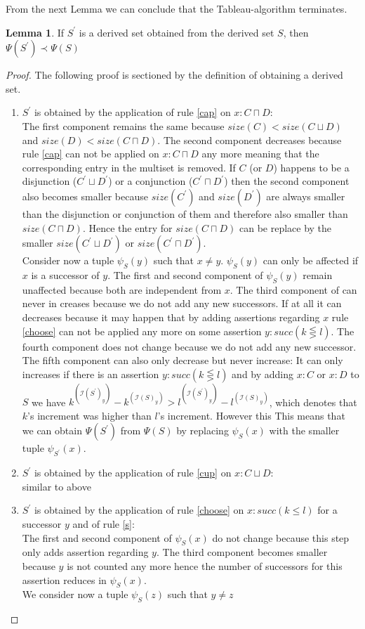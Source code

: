 \documentclass[a4paper,11pt]{scrartcl}
\theoremstyle{break}
\theoremstyle{definition}
\newtheorem{mylem}{Lemma}
\begin{document}
From the next Lemma we can conclude that the Tableau-algorithm terminates.
\begin{mylem}
If $S^\prime$ is a derived set obtained from the derived set $S$, then $\Psi(S^\prime)\prec\Psi(S)$
\end{mylem}
\begin{proof}
The following proof is sectioned by the definition of obtaining a derived set.
\begin{enumerate}
\item $S^\prime$ is obtained by the application of rule \ref{cap} on $x:C\sqcap D$:\\
The first component remains the same because $size(C)<size(C\sqcup D)$ and $size(D)<size(C\sqcap D)$. The second component decreases because rule \ref{cap} can not be applied on $x:C\sqcap D$ any more meaning that the corresponding entry in the multiset is removed. If $C$ (or $D$) happens to be a disjunction ($C^\prime\sqcup D^\prime$) or a conjunction ($C^\prime\sqcap D^\prime$) then the second component also becomes smaller because $size(C^\prime)$ and $size(D^\prime)$ are always smaller than the disjunction or conjunction of them and therefore also smaller than $size(C\sqcap D)$. Hence the entry for $size(C\sqcap D)$ can be replace by the smaller $size(C^\prime\sqcup D^\prime)$ or $size(C^\prime\sqcap D^\prime)$.\\
Consider now a tuple $\psi_S(y)$ such that $x\neq y$. $\psi_S(y)$ can only be affected if $x$ is a successor of $y$. The first and second component of $\psi_S(y)$ remain unaffected because both are independent from $x$. The third component of can never in creases because we do not add any new successors. If at all it can decreases because it may happen that by adding assertions regarding $x$ rule \ref{choose} can not be applied any more on some assertion $y:succ(k\lesseqgtr l)$. The fourth component does not change because we do not add any new successor. The fifth component can also only decrease but never increase: It can only increases if there is an assertion $y:succ(k\lesseqgtr l)$ and by adding $x:C$ or $x:D$ to $S$ we have $k^(\mathcal{I}(S^\prime)_y)-k^(\mathcal{I}(S)_y)>l^(\mathcal{I}(S^\prime)_y)-l^(\mathcal{I}(S)_y)$, which denotes that $k$'s increment was higher than $l$'s increment. However this 
This means that we can obtain $\Psi(S^\prime)$ from $\Psi(S)$ by replacing $\psi_S(x)$ with the smaller tuple $\psi_{S^\prime}(x)$. 
\item $S^\prime$ is obtained by the application of rule \ref{cup} on $x:C\sqcup D$:\\
similar to above
\item $S^\prime$ is obtained by the application of rule \ref{choose} on $x:succ(k\leq l)$ for a successor $y$ and of rule \ref{s}:\\
The first and second component of $\psi_S(x)$ do not change because this step only adds assertion regarding $y$. The third component becomes smaller because $y$ is not counted any more hence the number of successors for this assertion reduces in $\psi_S(x)$.\\
We consider now a tuple $\psi_S(z)$ such that $y\neq z$
\end{enumerate}
\end{proof}
\end{document}
